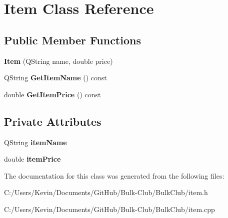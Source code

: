 \hypertarget{class_item}{}\section{Item Class Reference}
\label{class_item}
\subsection*{Public Member Functions}
\begin{DoxyCompactItemize}
\item 
\mbox{\label{class_item_a53775715216c52abe8b935716fe2f9c0}} 
{\bfseries Item} (Q\+String name, double price)
\item 
\mbox{\label{class_item_a2d931852889fde95b3555b0fedbffc09}} 
Q\+String {\bfseries Get\+Item\+Name} () const
\item 
\mbox{\label{class_item_a402405e399d9fa866090a90931817c1d}} 
double {\bfseries Get\+Item\+Price} () const
\end{DoxyCompactItemize}
\subsection*{Private Attributes}
\begin{DoxyCompactItemize}
\item 
\mbox{\label{class_item_ae145622d2df65a4a45979fd7933b30c7}} 
Q\+String {\bfseries item\+Name}
\item 
\mbox{\label{class_item_aa3f106177de7d68189cfe2b9051a54fd}} 
double {\bfseries item\+Price}
\end{DoxyCompactItemize}


The documentation for this class was generated from the following files\+:\begin{DoxyCompactItemize}
\item 
C\+:/\+Users/\+Kevin/\+Documents/\+Git\+Hub/\+Bulk-\/\+Club/\+Bulk\+Club/item.\+h\item 
C\+:/\+Users/\+Kevin/\+Documents/\+Git\+Hub/\+Bulk-\/\+Club/\+Bulk\+Club/item.\+cpp\end{DoxyCompactItemize}
